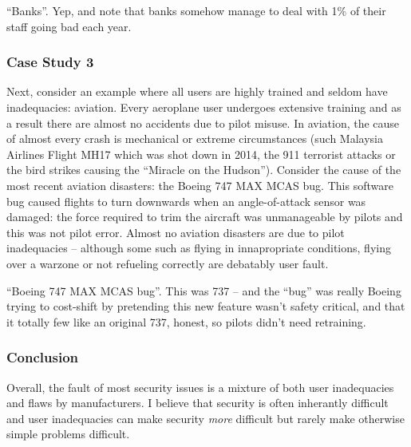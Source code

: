 \documentclass[10pt,\jkfside,a4paper]{article}
\begin{document}
\begin{enumerate}
{\color{blue} ``Banks''. Yep, and note that banks somehow manage to deal with 1\% of their staff going bad each year.}

\subsubsection*{Case Study 3}

Next, consider an example where all users are highly trained and seldom have inadequacies: aviation. 
Every aeroplane user undergoes extensive training and as a result there are almost no accidents due to 
pilot misuse. In aviation, the cause of almost every crash is mechanical or extreme circumstances 
(such Malaysia Airlines Flight MH17 which was shot down in 2014, the 911 terrorist attacks or the 
bird strikes causing the ``Miracle on the Hudson''). Consider the cause of the most recent aviation 
disasters: the Boeing 747 MAX MCAS bug. This software bug caused flights to turn downwards when an 
angle-of-attack sensor was damaged: the force required to trim the aircraft was unmanageable by pilots 
and this was not pilot error. Almost no aviation disasters are due to pilot inadequacies -- although 
some such as flying in innapropriate conditions, flying over a warzone or not refueling correctly 
are debatably user fault.

{\color{blue} ``Boeing 747 MAX MCAS bug''. This was 737 -- and the ``bug'' was really Boeing trying to cost-shift by
pretending this new feature wasn't safety critical, and that it totally few like an original 737, honest, so pilots
didn't need retraining.}

\subsubsection*{Conclusion}

Overall, the fault of most security issues is a mixture of both user inadequacies and flaws by 
manufacturers. I believe that security is often inherantly difficult and user inadequacies 
can make security \textit{more} difficult but rarely make otherwise simple problems difficult.

\end{enumerate}
\end{document}
